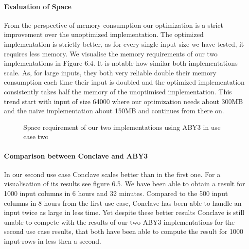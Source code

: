 \paragraph{Evaluation of Space}
From the perspective of memory consumption our optimization is a strict improvement over the unoptimized implementation.
The optimized implementation is strictly better, as for every single input size we have tested, it requires less memory. We visualise the memory requirements of our two implementations in Figure 6.4.
It is notable how similar both implementations scale. As, for large inputs, they both very reliable double their memory consumption each time their input is doubled and the optimized implementation consistently takes half the memory of the unoptimised implementation. This trend start with input of size 64000 where our optimization needs about 300MB and the naive implementation about 150MB and continues from there on.
\begin{figure}
	\caption{Space requirement of our two implementations using ABY3 in use case two}
\end{figure}
\paragraph{Comparison between Conclave and ABY3}
In our second use case Conclave scales better than in the first one. For a visualisation of its results see figure 6.5. We have been able to obtain a result for 1000 input columns in 6 hours and 32 minutes. Compared to the 500 input columns in 8 hours from the first use case, Conclave has been able to handle an input twice as large in less time. Yet despite these better results Conclave is still unable to compete with the results of our two ABY3 implementations for the second use case results, that both have been able to compute the result for 1000 input-rows in less then a second.

